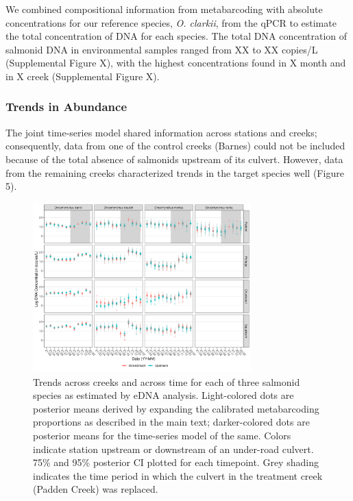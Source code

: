 \documentclass[
]{article}
\begin{document}
We combined compositional information from metabarcoding with absolute
concentrations for our reference species, \emph{O. clarkii}, from the
qPCR to estimate the total concentration of DNA for each species. The
total DNA concentration of salmonid DNA in environmental samples ranged
from XX to XX copies/L (Supplemental Figure X), with the highest
concentrations found in X month and in X creek (Supplemental Figure X).

\hypertarget{trends-in-abundance}{%
\subsubsection{Trends in Abundance}\label{trends-in-abundance}}

The joint time-series model shared information across stations and
creeks; consequently, data from one of the control creeks (Barnes) could
not be included because of the total absence of salmonids upstream of
its culvert. However, data from the remaining creeks characterized
trends in the target species well (Figure 5).

\begin{figure}
\centering
\includegraphics[width=0.75\textwidth,height=\textheight]{../Output/Figures/20221123_multispeciesTrends_flowcorrected.png}
\caption{Trends across creeks and across time for each of three salmonid
species as estimated by eDNA analysis. Light-colored dots are posterior
means derived by expanding the calibrated metabarcoding proportions as
described in the main text; darker-colored dots are posterior means for
the time-series model of the same. Colors indicate station upstream or
downstream of an under-road culvert. 75\% and 95\% posterior CI plotted
for each timepoint. Grey shading indicates the time period in which the
culvert in the treatment creek (Padden Creek) was replaced.}
\end{figure}
\end{document}
